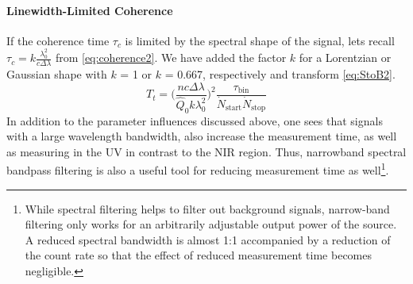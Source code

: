 \paragraph{Linewidth-Limited Coherence}
If the coherence time $\tau_c$ is limited by the spectral shape of the signal, lets recall $\tau_c=k \frac{\lambda^2_0}{c\Delta\lambda}$ from \cref{eq:coherence2}. We have added the factor $k$ for a Lorentzian or Gaussian shape with $k$ = \num{1} or $k$ = \num{0.667}, respectively and transform \cref{eq:StoB2}.
\begin{equation}\label{eq:StoB3}
	T_t= \Bigg(\dfrac{nc\Delta\lambda}{\hat{Q}_0 k\lambda^2_0}\Bigg)^2\dfrac{\tau_\mathrm{bin}}{\dot{N}_\mathrm{start}\dot{N}_\mathrm{stop}}
\end{equation}
In addition to the parameter influences discussed above, one sees that signals with a large wavelength bandwidth, also increase the measurement time, as well as measuring in the UV in contrast to the NIR region. Thus, narrowband spectral bandpass filtering is also a useful tool for reducing measurement time as well\footnote{While spectral filtering helps to filter out background signals, narrow-band filtering only works for an arbitrarily adjustable output power of the source. A reduced spectral bandwidth is almost 1:1 accompanied by a reduction of the count rate so that the effect of reduced measurement time becomes negligible.}.

